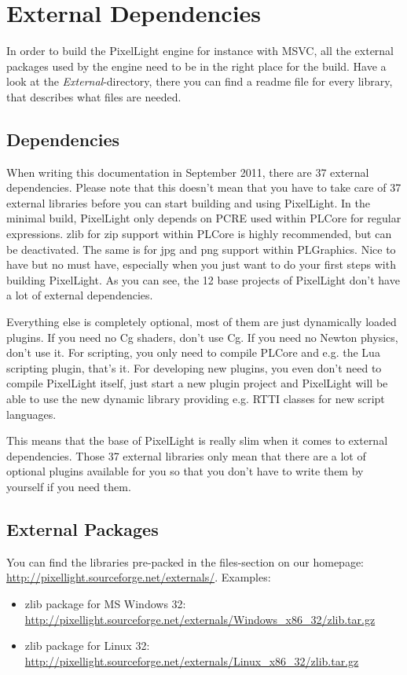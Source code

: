 \chapter{External Dependencies}
\label{Chapter:ExternalDependencies}
In order to build the PixelLight engine for instance with \ac{MSVC}, all the external packages used by the engine need to be in the right place for the build. Have a look at the \emph{External}-directory, there you can find a readme file for every library, that describes what files are needed.




\section{Dependencies}
When writing this documentation in September 2011, there are 37 external dependencies. Please note that this doesn't mean that you have to take care of 37 external libraries before you can start building and using PixelLight. In the minimal build, PixelLight only depends on PCRE used within PLCore for regular expressions. zlib for zip support within PLCore is highly recommended, but can be deactivated. The same is for jpg and png support within PLGraphics. Nice to have but no must have, especially when you just want to do your first steps with building PixelLight. As you can see, the 12 base projects of PixelLight don't have a lot of external dependencies.

Everything else is completely optional, most of them are just dynamically loaded plugins. If you need no Cg shaders, don't use Cg. If you need no Newton physics, don't use it. For scripting, you only need to compile PLCore and e.g. the Lua scripting plugin, that's it. For developing new plugins, you even don't need to compile PixelLight itself, just start a new plugin project and PixelLight will be able to use the new dynamic library providing e.g. \ac{RTTI} classes for new script languages.

This means that the base of PixelLight is really slim when it comes to external dependencies. Those 37 external libraries only mean that there are a lot of optional plugins available for you so that you don't have to write them by yourself if you need them.




\section{External Packages}
You can find the libraries pre-packed in the files-section on our homepage: \url{http://pixellight.sourceforge.net/externals/}. Examples:
\begin{itemize}
\item{zlib package for MS Windows \SI{32}{\bit}: \url{http://pixellight.sourceforge.net/externals/Windows_x86_32/zlib.tar.gz}}
\item{zlib package for Linux \SI{32}{\bit}: \url{http://pixellight.sourceforge.net/externals/Linux_x86_32/zlib.tar.gz}}
\end{itemize}


